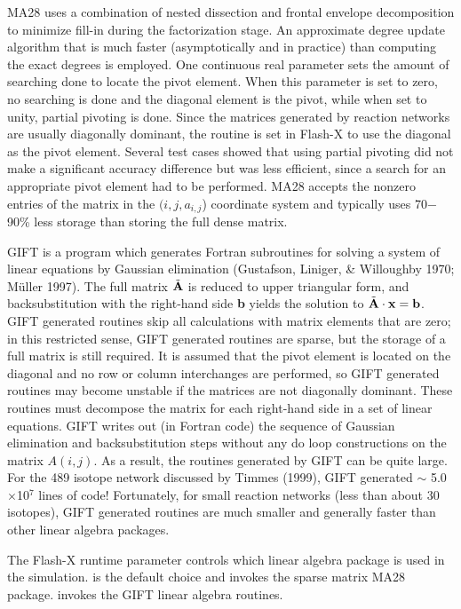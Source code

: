 MA28 uses a combination of nested dissection and frontal envelope
decomposition to minimize fill-in during the factorization stage.  An
approximate degree update algorithm that is much faster
(asymptotically and in practice) than computing the exact degrees is
employed.  One continuous real parameter sets the amount of searching
done to locate the pivot element. When this parameter is set to zero,
no searching is done and the diagonal element is the pivot, while when
set to unity, partial pivoting is done.  Since the matrices
generated by reaction networks are usually diagonally dominant, the
routine is set in Flash-X to use the diagonal as the pivot
element. Several test cases showed that using partial pivoting did not
make a significant accuracy difference but was less efficient, since
a search for an appropriate pivot element had to be performed.  MA28
accepts the nonzero entries of the matrix in the \hbox{$(i, j,
a_{i,j}$)} coordinate system and typically uses 70$-$90\% less
storage than storing the full dense matrix.


GIFT is a program which generates Fortran subroutines for solving a
system of linear equations by Gaussian elimination (Gustafson,
Liniger, \& Willoughby 1970; M\"uller 1997).  The full matrix
$\tilde{{\bf A}}$ is reduced to upper triangular form, and
backsubstitution with the right-hand side {\bf b} yields the solution
to $\tilde{{\bf A}} \cdot {\bf x} = {\bf b}$.  GIFT generated routines
skip all calculations with matrix elements that are zero; in this
restricted sense, GIFT generated routines are sparse, but the storage
of a full matrix is still required.  It is assumed that the pivot
element is located on the diagonal and no row or column interchanges
are performed, so GIFT generated routines may become unstable if the
matrices are not diagonally dominant.  These routines must decompose
the matrix for each right-hand side in a set of linear equations.
GIFT writes out (in Fortran code) the sequence of Gaussian elimination
and backsubstitution steps without any do loop constructions on the matrix
$A(i,j)$. As a result, the routines generated by GIFT can be quite
large. For the 489 isotope network discussed by Timmes (1999), GIFT
generated $\sim$ 5.0$\times$10$^7$ lines of code! Fortunately, for
small reaction networks (less than about 30 isotopes), GIFT generated
routines are much smaller and generally faster than other linear
algebra packages.


The Flash-X runtime parameter  controls
which linear algebra package is used in the simulation.  
is the default choice and invokes the sparse matrix MA28 package.
 invokes the GIFT linear algebra routines.





